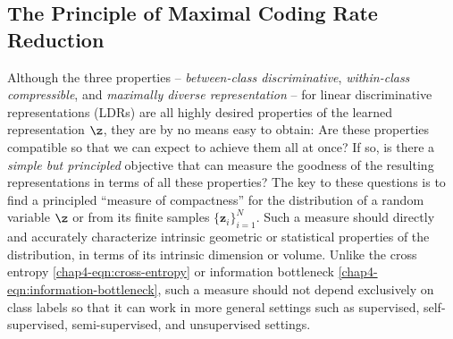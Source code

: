 \documentclass[../../book-main.tex]{subfiles}
\begin{document}
\subsection{The Principle of Maximal Coding Rate Reduction}\label{subsec:MCR2}





Although the three properties -- {\em between-class discriminative}, {\em within-class compressible}, and {\em maximally diverse representation} -- for linear discriminative representations (LDRs) are all highly desired properties  of the learned representation $\z$, they are by no means easy to obtain: Are these properties compatible so that we can expect to achieve them all at once? If so, is there a {\em simple but principled} objective that can measure the goodness of the resulting representations in terms of all these properties? The key to these questions {is to find} a principled ``measure of compactness'' for the distribution of a random variable $\z$ or from its finite samples $\{\bm z_i\}_{i=1}^N$. Such a measure should directly and accurately characterize intrinsic geometric or statistical properties of the distribution, in terms of its intrinsic dimension or {volume}. Unlike the cross entropy \eqref{chap4-eqn:cross-entropy} or information bottleneck \eqref{chap4-eqn:information-bottleneck}, such a measure should not depend exclusively on class labels so that it can work in more general settings such as supervised, self-supervised, semi-supervised, and unsupervised settings.
\end{document}
